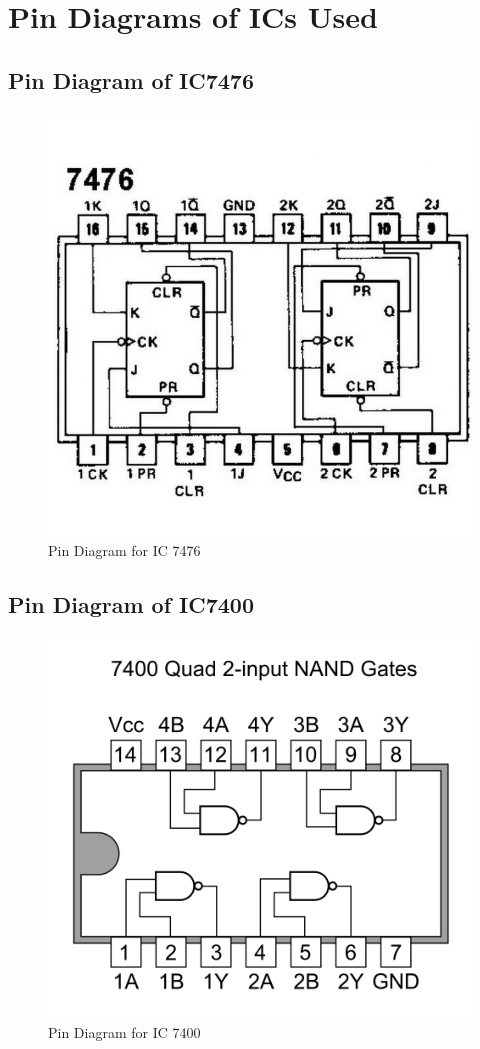 \documentclass[11pt]{article}
\begin{document}
\section{Pin Diagrams of ICs Used}

\subsection{Pin Diagram of IC7476}
\begin{figure}[H]
	\centering
	\includegraphics[scale = 0.35]{7476.jpg}
	\caption{Pin Diagram for IC 7476}
\end{figure}
\subsection{Pin Diagram of IC7400}
\begin{figure}[H]
	\centering
	\includegraphics[scale = 0.25]{7400.png}
	\caption{Pin Diagram for IC 7400}
\end{figure}
\end{document}
